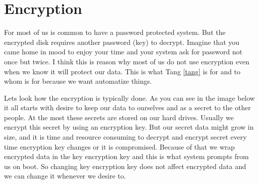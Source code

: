 \documentclass[../xdudla00-porting-Tang-to-Open-WRT.tex]{subfiles}
\begin{document}
\chapter{Encryption}\label{encryption}

For most of us is common to have a password protected system.
But the encrypted disk requires another password (key) to decrypt.
Imagine that you came home in mood to enjoy your time and your system ask for password not once but twice.
I think this is reason why most of us do not use encryption even when we know it will protect our data.
This is what Tang \ref{tang} is for and to whom is for because we want automatize things.

Lets look how the encryption is typically done. As you can see in the image below it all starts with desire to keep our data to ourselves and as a secret to the other people.
At the most these secrets are stored on our hard drives. Usually we encrypt this secret by using an encryption key.
But our secret data might grow in size, and it is time and resource consuming to decrypt and encrypt secret every time encryption key changes or it is compromised.
Because of that we wrap encrypted data in the key encryption key and this is what system prompts from us on boot.
So changing key encryption key does not affect encrypted data and we can change it whenever we desire to.


\end{document}
